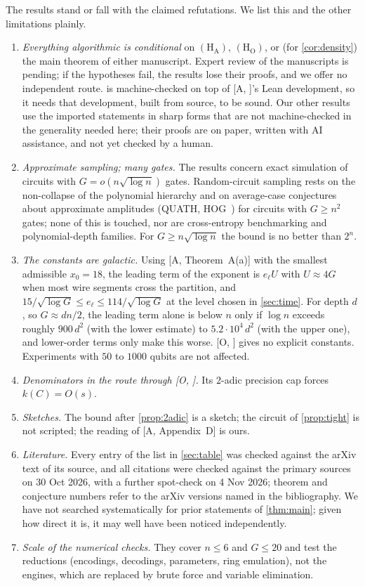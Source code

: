 \documentclass[10pt]{amsart}
\theoremstyle{plain}
\theoremstyle{definition}
\theoremstyle{remark}
\numberwithin{equation}{section}
\newcommand{\A}[1][]{\textup{[A\if\relax\detokenize{#1}\relax\else, #1\fi]}}
\newcommand{\Oa}[1][]{\textup{[O\if\relax\detokenize{#1}\relax\else, #1\fi]}}
\begin{document}
The results stand or fall with the claimed refutations. We list this and the other limitations
plainly.
\begin{enumerate}[label=\textup{(\alph*)}]
\item \emph{Everything algorithmic is conditional} on $(\mathrm{H}_{\mathrm{A}})$,
$(\mathrm{H}_{\mathrm{O}})$, or (for \cref{cor:density}) the main theorem of either manuscript.
Expert review of the manuscripts is pending; if the hypotheses fail, the results lose their proofs,
and we offer no independent route.  is machine-checked on top of \A's Lean development,
so it needs that development, built from source, to be sound. Our other results use the imported
statements in sharp forms that are not machine-checked in the generality needed here; their proofs
are on paper, written with AI assistance, and not yet checked by a human.
\item \emph{Approximate sampling; many gates.} The results concern exact simulation of circuits with
$G=o(n\sqrt{\log n})$ gates. Random-circuit sampling rests on the non-collapse of the polynomial
hierarchy and on average-case conjectures about approximate amplitudes (QUATH, HOG~\cite{AC17}) for
circuits with $G\ge n^2$ gates; none of this is touched, nor are cross-entropy benchmarking and
polynomial-depth families. For $G\ge n\sqrt{\log n}$ the bound is no better than $2^n$.
\item \emph{The constants are galactic.} Using \A[Theorem~A(a)] with the smallest admissible
$x_0=18$, the leading term of the exponent is $e_\ell U$ with $U\approx4G$ when most wire segments
cross the partition, and $15/\sqrt{\log G}\le e_\ell\le114/\sqrt{\log G}$ at the level chosen in
\cref{sec:time}. For depth $d$, so $G\approx dn/2$, the leading term alone is below $n$ only if
$\log n$ exceeds roughly $900\,d^2$ (with the lower estimate) to $5.2\cdot10^4\,d^2$ (with the upper
one), and lower-order terms only make this worse. \Oa{} gives no explicit constants. Experiments with
$50$ to $1000$ qubits are not affected.
\item \emph{Denominators in the route through \Oa.} Its $2$-adic precision cap forces $k(C)=O(s)$.
\item \emph{Sketches.} The bound after \cref{prop:2adic} is a sketch; the circuit of
\cref{prop:tight} is not scripted; the reading of \A[Appendix~D] is ours.
\item \emph{Literature.} Every entry of the list in \cref{sec:table} was checked against the arXiv text of its
source, and all citations were checked against the primary sources on 30 Oct 2026, with a further
spot-check on 4 Nov 2026; theorem and conjecture numbers refer to the arXiv versions named in the
bibliography. We have not searched systematically for prior statements of \cref{thm:main}; given how
direct it is, it may well have been noticed independently.
\item \emph{Scale of the numerical checks.} They cover $n\le6$ and $G\le20$ and test the reductions
(encodings, decodings, parameters, ring emulation), not the engines, which are replaced by brute
force and variable elimination.
\end{enumerate}
\end{document}
